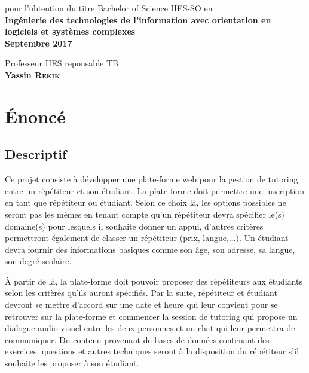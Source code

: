 \documentclass[a4paper]{scrreprt}
\begin{document}
\begin{titlepage}
\begin{center}
    { \Large pour l'obtention du titre Bachelor of Science HES-SO en}\\[0.5cm]
    {\Large \textbf{Ingénierie des technologies de l’information avec orientation en logiciels et systèmes complexes}}\\[1cm]
    
    {\Large \textbf{Septembre 2017}} %
\end{center}

\vspace*{4cm} %

\begin{flushleft}
{ \Large Professeur HES reponsable TB}\\[0.2cm]
{ \Large \textbf{Yassin \textsc{Rekik}}}
\end{flushleft}
 
\newpage
\end{titlepage}
\ClearShipoutPicture


\chapter*{Énoncé}
\section*{Descriptif}
Ce projet consiste à développer une plate-forme web pour la gestion de tutoring entre un répétiteur et son étudiant. La plate-forme doit permettre une inscription en tant que répétiteur ou étudiant. Selon ce choix là, les options possibles ne seront pas les mêmes en tenant compte qu'un répétiteur devra spécifier le(s) domaine(s) pour lesquels il souhaite donner un appui, d'autres critères permettront également de classer un répétiteur (prix, langue,...). Un étudiant devra fournir des informations basiques comme son âge, son adresse, sa langue, son degré scolaire.

À partir de là, la plate-forme doit pouvoir proposer des répétiteurs aux étudiants selon les critères qu'ils auront spécifiés. Par la suite, répétiteur et étudiant devront se mettre d'accord sur une date et heure qui leur convient pour se retrouver sur la plate-forme et commencer la session de tutoring qui propose un dialogue audio-visuel entre les deux personnes et un chat qui leur permettra de communiquer. Du contenu provenant de bases de données contenant des exercices, questions et autres techniques seront à la disposition du répétiteur s'il souhaite les proposer à son étudiant.
\end{document}

